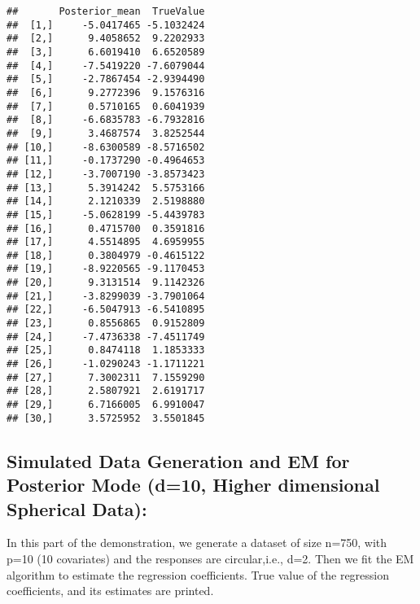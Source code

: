 \documentclass[
]{article}
\begin{document}
\begin{verbatim}
##       Posterior_mean  TrueValue
##  [1,]     -5.0417465 -5.1032424
##  [2,]      9.4058652  9.2202933
##  [3,]      6.6019410  6.6520589
##  [4,]     -7.5419220 -7.6079044
##  [5,]     -2.7867454 -2.9394490
##  [6,]      9.2772396  9.1576316
##  [7,]      0.5710165  0.6041939
##  [8,]     -6.6835783 -6.7932816
##  [9,]      3.4687574  3.8252544
## [10,]     -8.6300589 -8.5716502
## [11,]     -0.1737290 -0.4964653
## [12,]     -3.7007190 -3.8573423
## [13,]      5.3914242  5.5753166
## [14,]      2.1210339  2.5198880
## [15,]     -5.0628199 -5.4439783
## [16,]      0.4715700  0.3591816
## [17,]      4.5514895  4.6959955
## [18,]      0.3804979 -0.4615122
## [19,]     -8.9220565 -9.1170453
## [20,]      9.3131514  9.1142326
## [21,]     -3.8299039 -3.7901064
## [22,]     -6.5047913 -6.5410895
## [23,]      0.8556865  0.9152809
## [24,]     -7.4736338 -7.4511749
## [25,]      0.8474118  1.1853333
## [26,]     -1.0290243 -1.1711221
## [27,]      7.3002311  7.1559290
## [28,]      2.5807921  2.6191717
## [29,]      6.7166005  6.9910047
## [30,]      3.5725952  3.5501845
\end{verbatim}

\hypertarget{simulated-data-generation-and-em-for-posterior-mode-d10-higher-dimensional-spherical-data}{%
\subsection{Simulated Data Generation and EM for Posterior Mode (d=10,
Higher dimensional Spherical
Data):}\label{simulated-data-generation-and-em-for-posterior-mode-d10-higher-dimensional-spherical-data}}

In this part of the demonstration, we generate a dataset of size n=750,
with p=10 (10 covariates) and the responses are circular,i.e., d=2. Then
we fit the EM algorithm to estimate the regression coefficients. True
value of the regression coefficients, and its estimates are printed.
\end{document}

